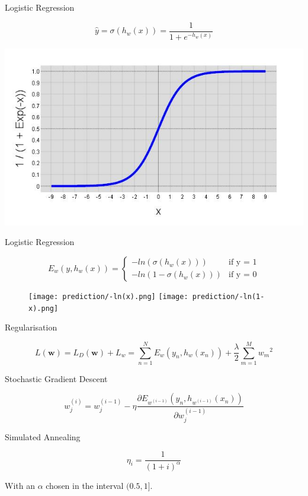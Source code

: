 \begin{frame}{Logistic Regression}

\[ \hat{y} = \sigma(h_w(x)) = \frac{1}{1+e^{-h_w(x)}} \]

\includegraphics[scale=0.5]{prediction/sigmoid}

\end{frame}	


\begin{frame}{Logistic Regression}


\[E_w(y,h_w(x)) = \begin{cases}
	-ln(\sigma(h_w(x))) &\text{if y = 1}\\	
	-ln(1-\sigma(h_w(x))) &\text{if y = 0}
\end{cases}\]
%

\begin{figure}
   \texttt{[image: prediction/-ln(x).png]}
   \hfill
   \texttt{[image: prediction/-ln(1-x).png]}
\end{figure}

\end{frame}

\begin{frame}{Regularisation}

\[ L(\mathbf{w})
  = L_D(\mathbf{w}) + L_w 
  = \sum_{n=1}^N E_w(y_n, h_w(x_n)) + \frac{\lambda}{2} \sum_{m=1}^{M} {w_m}^2 \] 

\end{frame}

\begin{frame}{Stochastic Gradient Descent}

\[ w_j^{(i)} = w_j^{(i-1)} - \eta \frac{\partial E_{w^{(i-1)}}(y_n, h_{w^{(i-1)}}(x_n))}{\partial w_j^{(i-1)}} \]

\end{frame}


\begin{frame}{Simulated Annealing}

$$\eta_i = \frac{1}{(1+i)^\alpha}$$


With an $\alpha$ chosen in the interval $(0.5,1]$. 

\end{frame}


